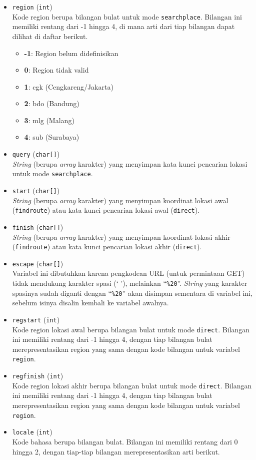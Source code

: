 \begin{itemize}
	\item \verb|region| (\verb|int|) \\
	Kode region berupa bilangan bulat untuk mode \verb|searchplace|. Bilangan ini memiliki rentang dari -1 hingga 4, di mana arti dari tiap bilangan dapat dilihat di daftar berikut.
	
	\begin{itemize}
		\item \textbf{-1}: Region belum didefinisikan
		\item \textbf{0}: Region tidak valid
		\item \textbf{1}: cgk (Cengkareng/Jakarta)
		\item \textbf{2}: bdo (Bandung)
		\item \textbf{3}: mlg (Malang)
		\item \textbf{4}: sub (Surabaya)
	\end{itemize}
	
	\item \verb|query| (\verb|char[]|) \\
	\textit{String} (berupa \textit{array} karakter) yang menyimpan kata kunci pencarian lokasi untuk mode \verb|searchplace|.
	\item \verb|start| (\verb|char[]|) \\
	\textit{String} (berupa \textit{array} karakter) yang menyimpan koordinat lokasi awal (\verb|findroute|) atau kata kunci pencarian lokasi awal (\verb|direct|).
	\item \verb|finish| (\verb|char[]|) \\
	\textit{String} (berupa \textit{array} karakter) yang menyimpan koordinat lokasi akhir (\verb|findroute|) atau kata kunci pencarian lokasi akhir (\verb|direct|).
	\item \verb|escape| (\verb|char[]|) \\
	Variabel ini dibutuhkan karena pengkodean URL (untuk permintaan GET) tidak mendukung karakter spasi (` '), melainkan ``\verb|%20|''. \textit{String} yang karakter spasinya sudah diganti dengan ``\verb|%20|'' akan disimpan sementara di variabel ini, sebelum isinya disalin kembali ke variabel awalnya.
	\item \verb|regstart| (\verb|int|) \\
	Kode region lokasi awal berupa bilangan bulat untuk mode \verb|direct|. Bilangan ini memiliki rentang dari -1 hingga 4, dengan tiap bilangan bulat merepresentasikan region yang sama dengan kode bilangan untuk variabel \verb|region|.
	\item \verb|regfinish| (\verb|int|) \\
	Kode region lokasi akhir berupa bilangan bulat untuk mode \verb|direct|. Bilangan ini memiliki rentang dari -1 hingga 4, dengan tiap bilangan bulat merepresentasikan region yang sama dengan kode bilangan untuk variabel \verb|region|.
	\item \verb|locale| (\verb|int|) \\
	Kode bahasa berupa bilangan bulat. Bilangan ini memiliki rentang dari 0 hingga 2, dengan tiap-tiap bilangan merepresentasikan arti berikut.
	

\end{itemize}
